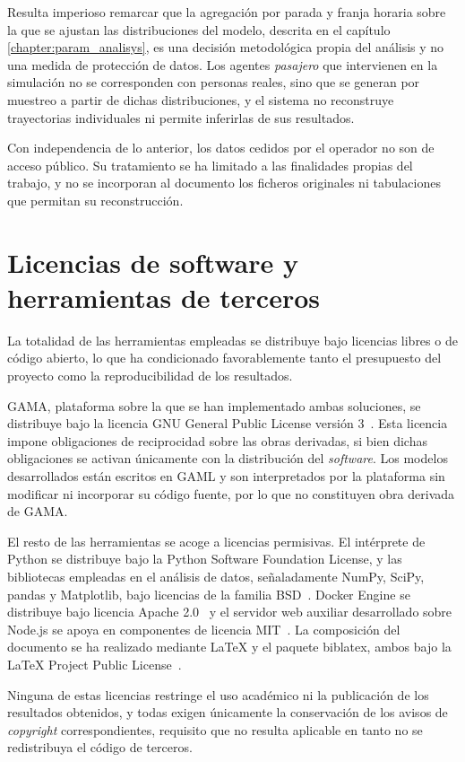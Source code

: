Resulta imperioso remarcar que la agregación por parada y franja horaria sobre la que se ajustan las
distribuciones del modelo, descrita en el capítulo \ref{chapter:param_analisys}, es una
decisión metodológica propia del análisis y no una medida de protección de datos. Los
agentes \textit{pasajero} que intervienen en la simulación no se corresponden con personas
reales, sino que se generan por muestreo a partir de dichas distribuciones, y el sistema no
reconstruye trayectorias individuales ni permite inferirlas de sus resultados.

Con independencia de lo anterior, los datos cedidos por el operador no son de acceso
público. Su tratamiento se ha limitado a las finalidades propias del trabajo, y no se
incorporan al documento los ficheros originales ni tabulaciones que permitan su
reconstrucción.

\section{Licencias de software y herramientas de terceros}

La totalidad de las herramientas empleadas se distribuye bajo licencias libres o de código
abierto, lo que ha condicionado favorablemente tanto el presupuesto del proyecto como la
reproducibilidad de los resultados.

GAMA, plataforma sobre la que se han implementado ambas soluciones, se distribuye bajo la
licencia GNU General Public License versión 3~\cite{gpl3}. Esta licencia impone obligaciones
de reciprocidad sobre las obras derivadas, si bien dichas obligaciones se activan únicamente
con la distribución del \textit{software}. Los modelos desarrollados están escritos en GAML
y son interpretados por la plataforma sin modificar ni incorporar su código fuente, por lo
que no constituyen obra derivada de GAMA.

El resto de las herramientas se acoge a licencias permisivas. El intérprete de Python se
distribuye bajo la Python Software Foundation License, y las bibliotecas empleadas en el
análisis de datos, señaladamente NumPy, SciPy, pandas y Matplotlib, bajo licencias de la
familia BSD~\cite{bsd3}. Docker Engine se distribuye bajo licencia Apache 2.0~\cite{apache2} y el servidor web auxiliar
desarrollado sobre Node.js se apoya en componentes de licencia MIT~\cite{mit}. La composición del
documento se ha realizado mediante \LaTeX{} y el paquete biblatex, ambos bajo la \LaTeX{}
Project Public License~\cite{lppl}.

Ninguna de estas licencias restringe el uso académico ni la publicación de los resultados
obtenidos, y todas exigen únicamente la conservación de los avisos de \textit{copyright}
correspondientes, requisito que no resulta aplicable en tanto no se redistribuya el código de
terceros.

